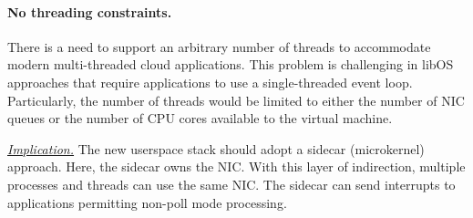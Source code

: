 

\paragraph{No threading constraints.}
\label{par:no-threading-constraints}
There is a need to support an arbitrary number of threads to accommodate modern multi-threaded cloud applications.
This problem is challenging in libOS approaches that require applications to use a single-threaded event loop.
Particularly, the number of threads would be limited to either the number of NIC queues or the number of CPU cores available to the virtual machine.

\ul{\textit{Implication.}} The new userspace stack should adopt a sidecar (microkernel) approach. Here, the sidecar owns the NIC. With this layer of indirection, multiple processes and threads can use the same NIC.
The sidecar can send interrupts to applications permitting non-poll mode processing.

